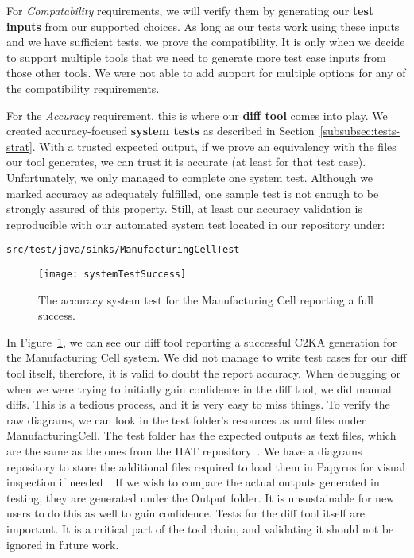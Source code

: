 For \textit{Compatability} requirements,
we will verify them by generating our \textbf{test inputs} from our supported choices.
As long as our tests work using these inputs and we have sufficient tests, we prove the compatibility.
It is only when we decide to support multiple tools that we need to generate more test case inputs from those other tools.
We were not able to add support for multiple options for any of the compatibility requirements.

For the \textit{Accuracy} requirement, this is where our \textbf{diff tool} comes into play.
We created accuracy-focused \textbf{system tests} as described in Section~\ref{subsubsec:tests-strat}.
With a trusted expected output, if we prove an equivalency with the files our tool generates, we can trust it is accurate (at least for that test case).
Unfortunately, we only managed to complete one system test.
Although we marked accuracy as adequately fulfilled, one sample test is not enough to be strongly assured of this property.
Still, at least our accuracy validation is reproducible with our automated system test located in our repository under:
\begin{verbatim}src/test/java/sinks/ManufacturingCellTest\end{verbatim}

\begin{figure}[h]
    \centering
    \texttt{[image: systemTestSuccess]}
    \caption{The accuracy system test for the Manufacturing Cell reporting a full success.}
    \label{fig:acc-test}
\end{figure}

In Figure~\ref{fig:acc-test}, we can see our diff tool reporting a successful C2KA generation for the Manufacturing Cell system.
We did not manage to write test cases for our diff tool itself, therefore, it is valid to doubt the report accuracy.
When debugging or when we were trying to initially gain confidence in the diff tool, we did manual diffs.
This is a tedious process, and it is very easy to miss things.
To verify the raw diagrams, we can look in the test folder's resources as uml files under ManufacturingCell.
The test folder has the expected outputs as text files, which are the same as the ones from the IIAT repository~\cite{repo_iiat}.
We have a diagrams repository to store the additional files required to load them in Papyrus for visual inspection if needed~\cite{repo_diagram}.
If we wish to compare the actual outputs generated in testing, they are generated under the Output folder.
It is unsustainable for new users to do this as well to gain confidence.
Tests for the diff tool itself are important.
It is a critical part of the tool chain, and validating it should not be ignored in future work.

